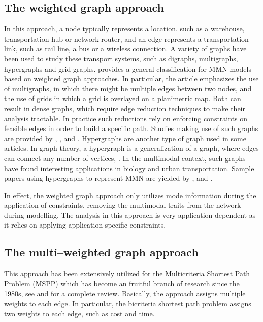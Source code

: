\documentclass[preprint,authoryear,12pt]{elsarticle}
\begin{document}
\subsection{The weighted graph approach}\label{SubSe:WeightedGraphApproach}

In this approach, a node typically represents a location, such as
a warehouse, transportation hub or network router, and an edge
represents a transportation link, such as rail line, a bus or a
wireless connection. A variety of graphs have been used to study
these transport systems, such as digraphs, multigraphs,
hypergraphs and grid graphs. \cite{Ayed2008} provides a
general classification for MMN models based on weighted graph
approaches. In particular, the article emphasizes the use of
multigraphs, in which there might be multiple edges between two
nodes, and the use of grids in which a grid is overlayed on a
planimetric map. Both can result in dense graphs, which require
edge reduction techniques to make their analysis tractable. In
practice such reductions rely on enforcing constraints on feasible
edges in order to build a specific path. Studies making use of such
graphs are provided by \cite{Ayed5}, \cite{Ayed11}, \cite{Ayed13} and
\cite{Fragouli2002}. Hypergraphs are another type of graph used in
some articles. In graph theory, a hypergraph is a generalization
of a graph, where edges can connect any number of vertices,
\cite{D944}. In the multimodal context, such graphs have found
interesting applications in biology and urban transportation.
Sample papers using hypergraphs to represent MMN are yielded by \cite{D933},
\cite{D964} and \cite{D947}.

In effect, the weighted graph approach only utilizes mode
information during the application of constraints, removing the
multimodal traits from the network during modelling.
The analysis in this approach is very application-dependent
as it relies on applying application-specific constraints.

\subsection{The multi--weighted graph approach}\label{SubSe:MultiweightedGraphApproach}

This approach has been extensively utilized for the Multicriteria
Shortest Path Problem (MSPP) which has become an fruitful branch
of research since the 1980s, see \cite{List1} and \cite{Soro2008}
for a complete review. Basically, the approach assigns multiple
weights to each edge. In particular, the bicriteria shortest path
problem assigns two weights to each edge, such as cost and
time.
\end{document}
